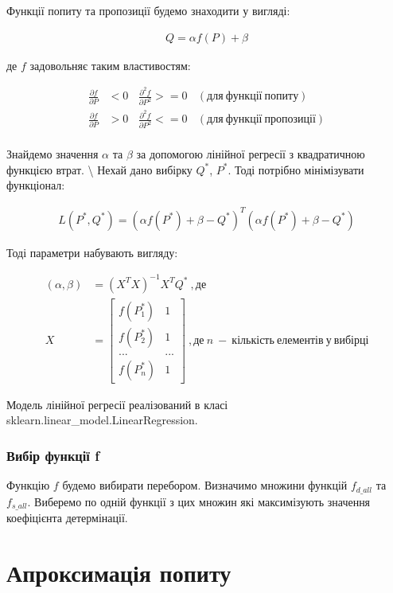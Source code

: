 \documentclass[11pt]{article}
\begin{document}
Функції попиту та пропозиції будемо знаходити у вигляді:

\begin{align}
Q=\alpha f(P)+\beta
\end{align}

де \(f\) задовольняє таким властивостям:

\begin{align}
\frac{\partial f}{\partial P} &< 0\ \ \ \ \frac{\partial^2 f}{\partial P^2} >= 0\ \ \ \ (для\ функції\ попиту) \\
\frac{\partial f}{\partial P} &> 0\ \ \ \ \frac{\partial^2 f}{\partial P^2} <= 0\ \ \ \ (для\ функції\ пропозиції) \\
\end{align}

Знайдемо значення \(\alpha\) та \(\beta\) за допомогою лінійної регресії
з квадратичною функцією втрат. \textbackslash{} Нехай дано вибірку
\(Q^*\), \(P^*\). Тоді потрібно мінімізувати функціонал:

\begin{align}
L(P^*,Q^*)=(\alpha f(P^*)+\beta - Q^*)^T(\alpha f(P^*)+\beta - Q^*)
\end{align}

Тоді параметри набувають вигляду:

\begin{align}
(\alpha, \beta) &= (X^T X)^{-1} X^T Q^*\ ,де\\
X &= \begin{bmatrix}f(P^*_1) & 1\\f(P^*_2) & 1\\... & ... \\ f(P^*_n) & 1\end{bmatrix}\ ,де\ n\ -\ кількість\ елементів\ у\ вибірці
\end{align}

Модель лінійної регресії реалізований в класі
sklearn.linear\_model.LinearRegression.

    \subsubsection{Вибір функції
f}\label{ux432ux438ux431ux456ux440-ux444ux443ux43dux43aux446ux456ux457-f}

Функцію \(f\) будемо вибирати перебором. Визначимо множини функцій
\(f_{d\_all}\) та \(f_{s\_all}\). Виберемо по одній функції з цих множин
які максимізують значення коефіцієнта детермінації.

    \section{Апроксимація
попиту}\label{ux430ux43fux440ux43eux43aux441ux438ux43cux430ux446ux456ux44f-ux43fux43eux43fux438ux442ux443}
\end{document}
